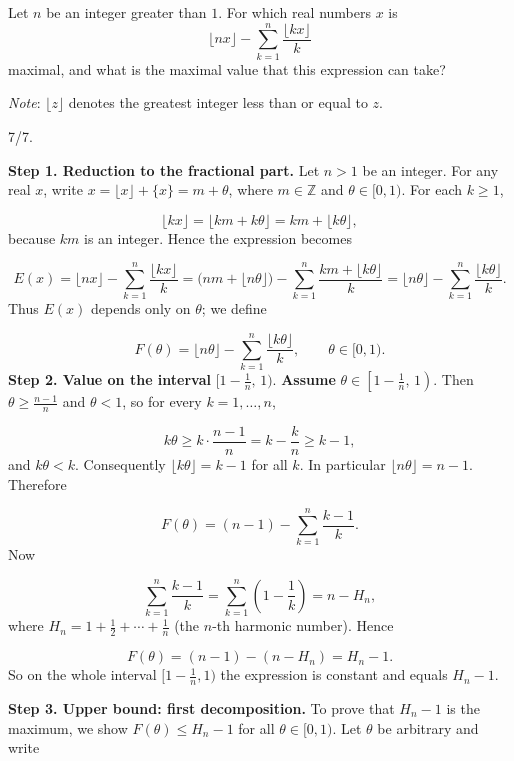 \begin{mdframed}[style=mdpurplebox,frametitle={USAMO 2026 Problem 1}]
Let $n$ be an integer greater than $1$. For which real numbers $x$ is
\[
\lfloor nx \rfloor - \sum_{k=1}^{n} \frac{\lfloor kx \rfloor}{k}
\]
maximal, and what is the maximal value that this expression can take?

\emph{Note}: $\lfloor z \rfloor$ denotes the greatest integer less than or equal to $z$.
\end{mdframed}
\begin{remark*}
  7/7.
\end{remark*}
\textbf{Step 1. Reduction to the fractional part.} Let \(n>1\) be an integer. For any real \(x\), write \(x = \lfloor x\rfloor + \{x\} = m + \theta\), where \(m\in\mathbb Z\) and \(\theta\in[0,1)\). For each \(k\ge 1\),\par
\[
\lfloor kx \rfloor = \lfloor km + k\theta \rfloor = km + \lfloor k\theta \rfloor,
\]
because \(km\) is an integer. Hence the expression becomes\par
\[
E(x) = \lfloor nx \rfloor - \sum_{k=1}^{n}\frac{\lfloor kx\rfloor}{k}
= \bigl( nm + \lfloor n\theta\rfloor \bigr) - \sum_{k=1}^{n}\frac{km + \lfloor k\theta\rfloor}{k}
= \lfloor n\theta\rfloor - \sum_{k=1}^{n}\frac{\lfloor k\theta\rfloor}{k}.
\]
Thus \(E(x)\) depends only on \(\theta\); we define\par
\[
F(\theta) = \lfloor n\theta\rfloor - \sum_{k=1}^{n}\frac{\lfloor k\theta\rfloor}{k},\qquad \theta\in[0,1).
\]
\textbf{Step 2. Value on the interval }\(\bigl[1-\frac1n,\,1\bigr)\).\textbf{ Assume }\(\theta\in\left[1-\frac1n,\,1\right)\). Then \(\theta\ge \frac{n-1}{n}\) and \(\theta<1\), so for every \(k=1,\dots,n\),\par
\[
k\theta \ge k\cdot\frac{n-1}{n}=k-\frac{k}{n}\ge k-1,
\]
and \(k\theta < k\). Consequently \(\lfloor k\theta\rfloor = k-1\) for all \(k\). In particular \(\lfloor n\theta\rfloor = n-1\). Therefore\par
\[
F(\theta) = (n-1) - \sum_{k=1}^{n}\frac{k-1}{k}.
\]
Now\par
\[
\sum_{k=1}^{n}\frac{k-1}{k} = \sum_{k=1}^{n}\left(1-\frac1k\right) = n - H_n,
\]
where \(H_n = 1 + \frac12 + \cdots + \frac1n\) (the \(n\)-th harmonic number). Hence\par
\[
F(\theta) = (n-1) - (n-H_n) = H_n - 1.
\]
So on the whole interval \([1-\frac1n,1)\) the expression is constant and equals \(H_n-1\).\par
\textbf{Step 3. Upper bound: first decomposition.} To prove that \(H_n-1\) is the maximum, we show \(F(\theta)\le H_n-1\) for all \(\theta\in[0,1)\). Let \(\theta\) be arbitrary and write\par
